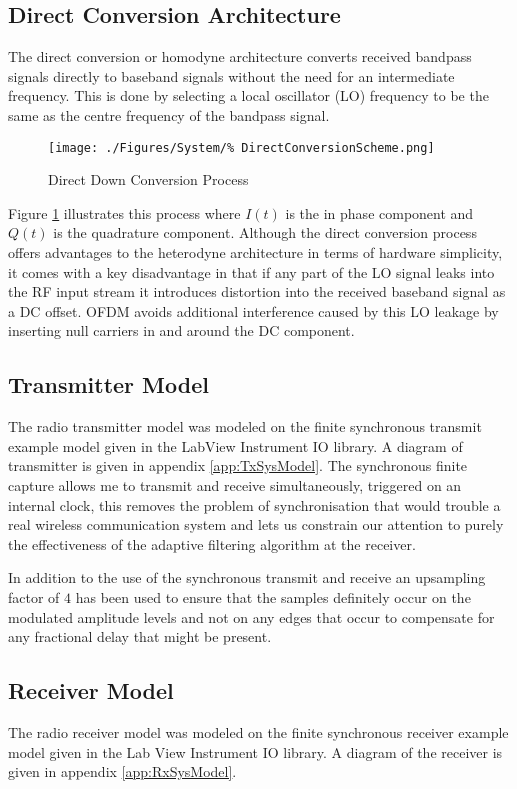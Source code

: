 \subsection{Direct Conversion Architecture}
\label{subsec:DirectConversion}
The direct conversion or homodyne architecture converts received %
bandpass signals directly to baseband signals without the need for %
an intermediate frequency. This is done by selecting a local %
oscillator (LO) frequency to be the same as the centre %
frequency of the bandpass signal.
\begin{figure}[ht]
	\centering
	\texttt{[image: ./Figures/System/\%
	DirectConversionScheme.png]}
	\caption{Direct Down Conversion Process}
	\label{fig:DDC}
\end{figure}
Figure \ref{fig:DDC} illustrates this process where $I(t)$ is the %
in phase component and $Q(t)$ is the quadrature component. %
Although the direct conversion process offers advantages to the %
heterodyne architecture in terms of hardware simplicity, it comes %
with a key disadvantage in that if any part of the LO signal %
leaks into the RF input stream it introduces distortion into the %
received baseband signal as a DC offset. OFDM avoids %
additional interference caused by this LO leakage by inserting %
null carriers in and around the DC component.

\subsection{Transmitter Model}

The radio transmitter model was modeled on the finite %
synchronous transmit example model given in the LabView %
Instrument IO library. A diagram of transmitter is given %
in appendix \ref{app:TxSysModel}. %
The synchronous finite capture allows me to %
transmit and receive simultaneously, triggered on %
an internal clock, this removes the problem of %
synchronisation that would trouble a real %
wireless communication system and lets us %
constrain our attention to purely the effectiveness %
of the adaptive filtering algorithm at the receiver. %

In addition to the use of the synchronous transmit and %
receive an upsampling factor of $4$ has been used %
to ensure that the samples definitely occur on the %
modulated amplitude levels and not on any edges that %
occur to compensate for any fractional delay that %
might be present.


\subsection{Receiver Model}
\FloatBarrier
The radio receiver model was modeled on the finite %
synchronous receiver example model given in the Lab%
View Instrument IO library. A diagram of the receiver %
is given in appendix \ref{app:RxSysModel}. %

